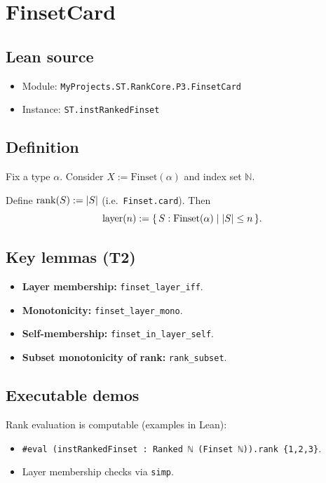 \section{FinsetCard}
\label{sec:ex-finsetcard}

\subsection{Lean source}
\begin{itemize}
\item Module: \texttt{MyProjects.ST.RankCore.P3.FinsetCard}
\item Instance: \texttt{ST.instRankedFinset}
\end{itemize}

\subsection{Definition}
Fix a type $\alpha$. Consider $X := \mathrm{Finset}(\alpha)$ and index set $\mathbb{N}$.
\begin{definition}
Define $\operatorname{rank}(S) := |S|$ (i.e.\ \texttt{Finset.card}).
Then
\[
  \operatorname{layer}(n) := \{\, S : \mathrm{Finset}(\alpha) \mid |S| \le n \,\}.
\]
\end{definition}

\subsection{Key lemmas (T2)}
\begin{itemize}
\item \textbf{Layer membership:} \texttt{finset\_layer\_iff}.
\item \textbf{Monotonicity:} \texttt{finset\_layer\_mono}.
\item \textbf{Self-membership:} \texttt{finset\_in\_layer\_self}.
\item \textbf{Subset monotonicity of rank:} \texttt{rank\_subset}.
\end{itemize}

\subsection{Executable demos}
Rank evaluation is computable (examples in Lean):
\begin{itemize}
\item \texttt{#eval (instRankedFinset : Ranked ℕ (Finset ℕ)).rank \{1,2,3\}}.
\item Layer membership checks via \texttt{simp}.
\end{itemize}

